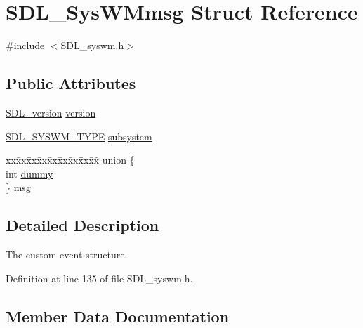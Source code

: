 \hypertarget{struct_s_d_l___sys_w_mmsg}{}\section{S\+D\+L\+\_\+\+Sys\+W\+Mmsg Struct Reference}
\label{struct_s_d_l___sys_w_mmsg}


{\ttfamily \#include $<$S\+D\+L\+\_\+syswm.\+h$>$}

\subsection*{Public Attributes}
\begin{DoxyCompactItemize}
\item 
\mbox{\hyperlink{struct_s_d_l__version}{S\+D\+L\+\_\+version}} \mbox{\hyperlink{struct_s_d_l___sys_w_mmsg_a95f9aae58d18ee8fac556416b322a5fb}{version}}
\item 
\mbox{\hyperlink{_s_d_l__syswm_8h_a064c26598287280fff2a00d6758ac4f7}{S\+D\+L\+\_\+\+S\+Y\+S\+W\+M\+\_\+\+T\+Y\+PE}} \mbox{\hyperlink{struct_s_d_l___sys_w_mmsg_a7c3900af5ea797f1318fc77ee0ecd11b}{subsystem}}
\item 
\begin{tabbing}
xx\=xx\=xx\=xx\=xx\=xx\=xx\=xx\=xx\=\kill
union \{\\
\>int \mbox{\hyperlink{struct_s_d_l___sys_w_mmsg_a8faf13f90f2477157b42b631308cd900}{dummy}}\\
\} \mbox{\hyperlink{struct_s_d_l___sys_w_mmsg_a8890abd547a386afa3a822f15568c162}{msg}}\\

\end{tabbing}\end{DoxyCompactItemize}


\subsection{Detailed Description}
The custom event structure. 

Definition at line 135 of file S\+D\+L\+\_\+syswm.\+h.



\subsection{Member Data Documentation}
\mbox{\label{struct_s_d_l___sys_w_mmsg_a8faf13f90f2477157b42b631308cd900}} 
